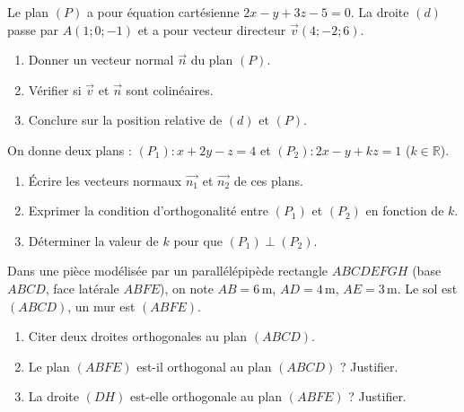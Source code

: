 \documentclass[11pt]{article}
\begin{document}
\begin{exercice}
Le plan $(P)$ a pour équation cartésienne $2x - y + 3z - 5 = 0$. La droite $(d)$ passe par $A(1;0;-1)$ et a pour vecteur directeur $\vec{v}(4;-2;6)$.
\begin{enumerate}
    \item Donner un vecteur normal $\vec{n}$ du plan $(P)$.
    \item Vérifier si $\vec{v}$ et $\vec{n}$ sont colinéaires.
    \item Conclure sur la position relative de $(d)$ et $(P)$.
\end{enumerate}
\end{exercice}

\begin{exercice}
On donne deux plans : $(P_1) : x + 2y - z = 4$ et $(P_2) : 2x - y + kz = 1$ ($k \in \mathbb{R}$).
\begin{enumerate}
    \item Écrire les vecteurs normaux $\vec{n_1}$ et $\vec{n_2}$ de ces plans.
    \item Exprimer la condition d'orthogonalité entre $(P_1)$ et $(P_2)$ en fonction de $k$.
    \item Déterminer la valeur de $k$ pour que $(P_1) \perp (P_2)$.
\end{enumerate}
\end{exercice}

\begin{exercice}
Dans une pièce modélisée par un parallélépipède rectangle $ABCDEFGH$ (base $ABCD$, face latérale $ABFE$), on note $AB=6\,\text{m}$, $AD=4\,\text{m}$, $AE=3\,\text{m}$. Le sol est $(ABCD)$, un mur est $(ABFE)$.
\begin{enumerate}
    \item Citer deux droites orthogonales au plan $(ABCD)$.
    \item Le plan $(ABFE)$ est-il orthogonal au plan $(ABCD)$ ? Justifier.
    \item La droite $(DH)$ est-elle orthogonale au plan $(ABFE)$ ? Justifier.
\end{enumerate}
\end{exercice}
\end{document}
